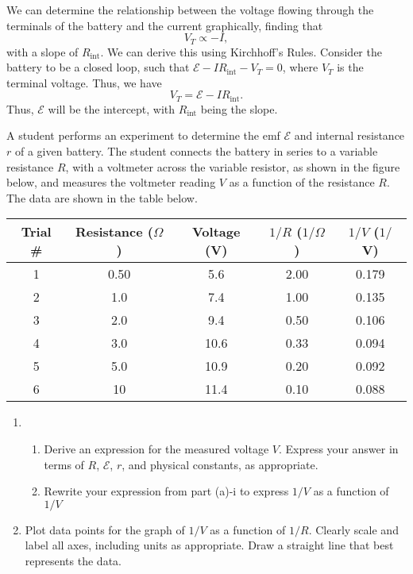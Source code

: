 \documentclass[11pt]{article}
\begin{document}
We can determine the relationship between the voltage flowing through the terminals of the battery and the current graphically, finding that \[V_T \propto -I,\] with a slope of $R_{\text{int}}$. We can derive this using Kirchhoff's Rules. Consider the battery to be a closed loop, such that $\mathcal{E} - IR_{\text{int}} - V_T= 0$, where $V_T$ is the terminal voltage. Thus, we have
\[V_T = \mathcal{E} - IR_{\text{int}}.\]
Thus, $\mathcal{E}$ will be the intercept, with $R_{\text{int}}$ being the slope.
\begin{example}[2015 AP \#2]\label{2015ap2}
    A student performs an experiment to determine the emf $\mathcal{E}$ and internal resistance $r$ of a given battery. The student connects the battery in series to a variable resistance $R$, with a voltmeter across the variable resistor, as shown in the figure below, and measures the voltmeter reading $V$ as a function of the resistance $R$. The data are shown in the table below.
    \begin{center}
    \begin{tabular}{ccccc} 
    \toprule
    Trial \# & Resistance ($\Omega$) & Voltage (V) & $1/R$ ($1/\Omega$) & $1/V$ ($1/$V) \\ \midrule
    1 & 0.50 & 5.6 & 2.00 & 0.179 \\
    2 & 1.0 & 7.4 & 1.00 & 0.135 \\
    3 & 2.0 & 9.4 & 0.50 & 0.106 \\
    4 & 3.0 & 10.6 & 0.33 & 0.094 \\
    5 & 5.0 & 10.9 & 0.20 & 0.092 \\
    6 & 10 & 11.4 & 0.10 & 0.088 \\ \bottomrule        
    \end{tabular}
    \end{center}
    \begin{enumerate}[label=(\alph*)]
        \item \begin{enumerate}[label=\roman*.]
            \item Derive an expression for the measured voltage $V$. Express your answer in terms of $R$, $\mathcal{E}$, $r$, and physical constants, as appropriate.
            \item Rewrite your expression from part (a)-i to express $1/V$ as a function of $1/V$
        \end{enumerate}
        \item Plot data points for the graph of $1/V$ as a function of $1/R$. Clearly scale and label all axes, including units as appropriate. Draw a straight line that best represents the data.

\end{enumerate}
\end{example}
\end{document}
